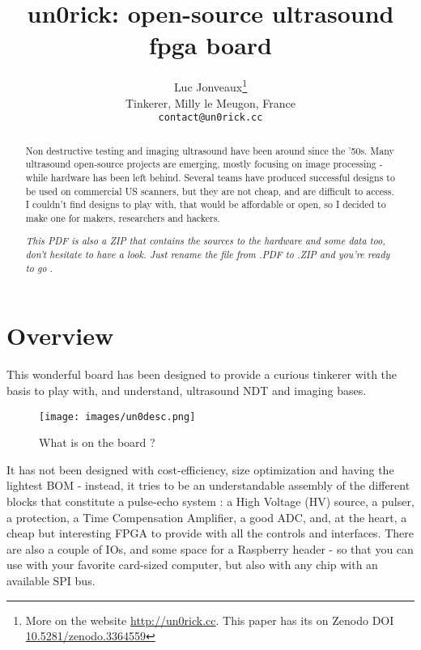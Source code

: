 \documentclass{article}
\title{un0rick: open-source ultrasound fpga board}
\author{
  Luc Jonveaux\thanks{More on the website \url{http://un0rick.cc}. This paper has its on Zenodo DOI  \href{http://doi.org/10.5281/zenodo.3364559}{10.5281/zenodo.3364559} } \\
  Tinkerer, Milly le Meugon, France\\
  \texttt{contact@un0rick.cc} \\
}
\begin{document}
\maketitle

\begin{abstract}
Non destructive testing and imaging ultrasound have been around since the ’50s. Many ultrasound open-source projects are emerging, mostly focusing on image processing - while hardware has been left behind. Several teams have produced successful designs to be used on commercial US scanners, but they are not cheap, and are difficult to access. I couldn’t find designs to play with, that would be affordable or open, so I decided to make one for makers, researchers and hackers.

\emph{ This PDF is also a ZIP that contains the sources to the hardware and some data too, don't hesitate to have a look. Just rename the file from .PDF to .ZIP and you're ready to go }.
\end{abstract}






\section{Overview}

This wonderful board has been designed to provide a curious tinkerer with the basis to play with, and understand, ultrasound NDT and imaging bases.

\begin{figure}[h!]
\centering
  \texttt{[image: images/un0desc.png]}
  \caption{What is on the board ?}
  \label{fig:board}
\end{figure}

It has not been designed with cost-efficiency, size optimization and having the lightest BOM - instead, it tries to be an understandable assembly of the different blocks that constitute a pulse-echo system : a High Voltage (HV) source, a pulser, a protection, a Time Compensation Amplifier, a good ADC, and, at the heart, a cheap but interesting FPGA to provide with all the controls and interfaces. There are also a couple of IOs, and some space for a Raspberry header - so that you can use with your favorite card-sized computer, but also with any chip with an available SPI bus.
\end{document}
